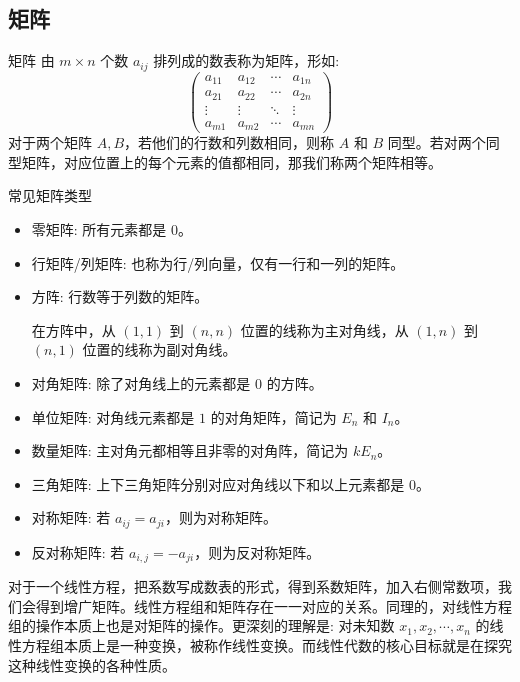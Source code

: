 \documentclass[a4paper,12pt]{ctexart}
\begin{document}
\newpage

\subsection{矩阵}
\begin{mydef}{矩阵}{}
由 $m \times n$ 个数 $a_{ij}$ 排列成的数表称为矩阵，形如:
\[
\begin{pmatrix}
a_{11} & a_{12} & \cdots & a_{1n} \\
a_{21} & a_{22} & \cdots & a_{2n} \\
\vdots & \vdots & \ddots & \vdots \\
a_{m1} & a_{m2} & \cdots & a_{mn}
\end{pmatrix}
\]
对于两个矩阵 $A,B$，若他们的行数和列数相同，则称 $A$ 和 $B$ 同型。若对两个同型矩阵，对应位置上的每个元素的值都相同，那我们称两个矩阵相等。
\end{mydef}

\begin{myprop}{常见矩阵类型}{}
\begin{itemize}
    \item 零矩阵: 所有元素都是 $0$。
    \item 行矩阵/列矩阵: 也称为行/列向量，仅有一行和一列的矩阵。
    \item 方阵: 行数等于列数的矩阵。
    
    在方阵中，从 $(1,1)$ 到 $(n,n)$ 位置的线称为主对角线，从 $(1,n)$ 到 $(n,1)$ 位置的线称为副对角线。
    
    \item 对角矩阵: 除了对角线上的元素都是 $0$ 的方阵。
    \item 单位矩阵: 对角线元素都是 $1$ 的对角矩阵，简记为 $E_n$ 和 $I_n$。
    \item 数量矩阵: 主对角元都相等且非零的对角阵，简记为 $kE_n$。
    \item 三角矩阵: 上下三角矩阵分别对应对角线以下和以上元素都是 $0$。
    \item 对称矩阵: 若 $a_{ij} = a_{ji}$，则为对称矩阵。
    \item 反对称矩阵: 若 $a_{i,j} = - a_{ji}$，则为反对称矩阵。
\end{itemize}
\end{myprop}

对于一个线性方程，把系数写成数表的形式，得到系数矩阵，加入右侧常数项，我们会得到增广矩阵。线性方程组和矩阵存在一一对应的关系。同理的，对线性方程组的操作本质上也是对矩阵的操作。更深刻的理解是: 对未知数 $x_1, x_2, \cdots , x_n$ 的线性方程组本质上是一种变换，被称作线性变换。而线性代数的核心目标就是在探究这种线性变换的各种性质。
\end{document}
